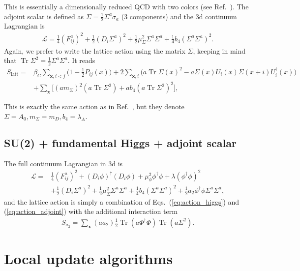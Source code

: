 \documentclass[11pt,a4paper]{article}
\newcommand\Tr{\operatorname{Tr}}
\newcommand\he[1]{#1^\dagger}%
\begin{document}
This is essentially a dimensionally reduced QCD with two colors (see Ref.~\cite{Kajantie:1997tt}). The adjoint scalar is defined as $\Sigma = \frac12 \Sigma^a \sigma_a$ (3 components) and the 3d continuum Lagrangian is 
\begin{align}
\mathcal{L} = \frac14 (F^a_{ij})^2 + \frac12 (D_i \Sigma^a)^2 + \frac12 \mu^2_\Sigma \Sigma^a\Sigma^a + \frac14 b_4 (\Sigma^a\Sigma^a)^2.
\end{align}
Again, we prefer to write the lattice action using the matrix $\Sigma$, keeping in mind that $\Tr \Sigma^2 = \frac12 \Sigma^a \Sigma^a$. It reads
\begin{align}
\label{eq:action_adjoint}
S_\text{latt} =& \beta_G \sum_{\textbf{x}, i<j} \Big(1-\frac12 P_{ij}(x)\Big) + 2\sum_{\textbf{x},i} \Big( a \Tr\Sigma(x)^2 - a \Sigma(x)U_i(x)\Sigma(x+i)\he U_i(x) \Big) \nonumber \\
& + \sum_\textbf{x} \bigg[ (a m_\Sigma)^2 (a \Tr \Sigma^2) + a b_4 (a \Tr \Sigma^2)^2\bigg],
\end{align}

This is exactly the same action as in Ref.~\cite{Kajantie:1997tt}, but they denote $\Sigma = A_0, m_\Sigma = m_D, b_4 = \lambda_A$.

\subsection{SU(2) + fundamental Higgs + adjoint scalar}

The full continuum Lagrangian in 3d is 
\begin{align}
\mathcal{L} =& \frac14 (F^a_{ij})^2 + (D_i \phi)^\dagger (D_i \phi) + \mu^2_\phi \phi^\dagger\phi + \lambda (\phi^\dagger\phi)^2 \nonumber \\ 
& + \frac12 (D_i \Sigma^a)^2 + \frac12 \mu^2_\Sigma \Sigma^a\Sigma^a + \frac14 b_4 (\Sigma^a\Sigma^a)^2 +\frac12 a_2 \phi^\dagger\phi \Sigma^a\Sigma^a,
\end{align}
and the lattice action is simply a combination of Eqs.~(\ref{eq:action_higgs}) and (\ref{eq:action_adjoint}) with the additional interaction term
\begin{align}
S_{a_2} = \sum_\textbf{x} (a a_2) \frac12 \Tr (a\he\Phi\Phi) \Tr (a\Sigma^2). 
\end{align}


\section{Local update algorithms}
\end{document}

